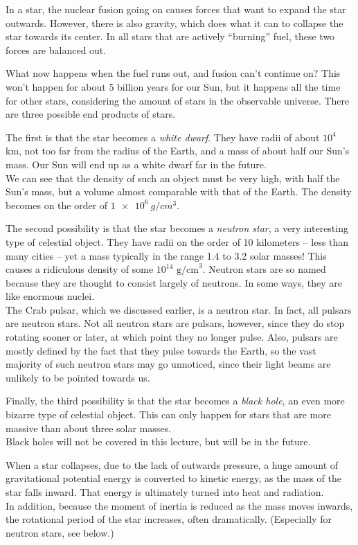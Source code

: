 In a star, 	the nuclear fusion going on causes forces that want to expand the star outwards. However, there is also gravity, which does what it can to collapse the star towards its center. In all stars that are actively ``burning'' fuel, these two forces are balanced out.

What now happens when the fuel runs out, and fusion can't continue on? This won't happen for about 5 billion years for our Sun, but it happens all the time for other stars, considering the amount of stars in the observable universe. There are three possible end products of stars.

The first is that the star becomes a \emph{white dwarf}. They have radii of about $10^4$ km, not too far from the radius of the Earth, and a mass of about half our Sun's mass. Our Sun will end up as a white dwarf far in the future.\\
We can see that the density of such an object must be very high, with half the Sun's mass, but a volume almost comparable with that of the Earth. The density becomes on the order of $\SI{1e6}{g/cm^3}$.

The second possibility is that the star becomes a \emph{neutron star}, a very interesting type of celestial object. They have radii on the order of 10 kilometers -- less than many cities -- yet a mass typically in the range 1.4 to 3.2 solar masses! This causes a ridiculous density of some $10^{14} \text{ g/cm}^3$. Neutron stars are so named because they are thought to consist largely of neutrons. In some ways, they are like enormous nuclei.\\
The Crab pulsar, which we discussed earlier, is a neutron star. In fact, all pulsars are neutron stars. Not all neutron stars are pulsars, however, since they do stop rotating sooner or later, at which point they no longer pulse. Also, pulsars are mostly defined by the fact that they pulse towards the Earth, so the vast majority of such neutron stars may go unnoticed, since their light beams are unlikely to be pointed towards us.

Finally, the third possibility is that the star becomes a \emph{black hole}, an even more bizarre type of celestial object. This can only happen for stars that are more massive than about three solar masses.\\
Black holes will not be covered in this lecture, but will be in the future.

When a star collapses, due to the lack of outwards pressure, a huge amount of gravitational potential energy is converted to kinetic energy, as the mass of the star falls inward. That energy is ultimately turned into heat and radiation.\\
In addition, because the moment of inertia is reduced as the mass moves inwards, the rotational period of the star increases, often dramatically. (Especially for neutron stars, see below.)

